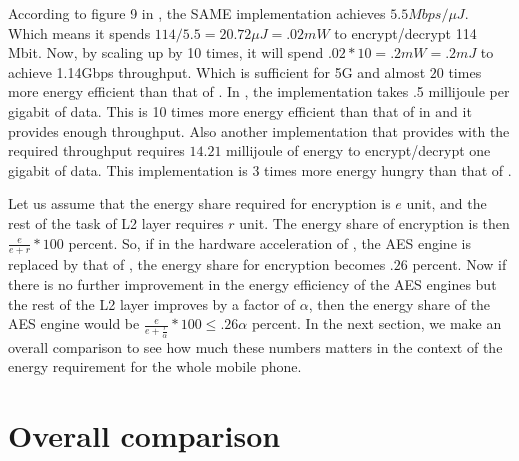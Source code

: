 According to figure 9 in \cite{Ruhr_2011}, the SAME implementation achieves $5.5Mbps/ \mu J$. Which means it spends $114/5.5 = 20.72\mu J = .02 mW$ to encrypt/decrypt 114 Mbit. Now, by scaling up by 10 times, it will spend $.02*10=.2mW = .2mJ$ to achieve 1.14Gbps throughput. Which is sufficient for 5G and almost $20$ times more energy efficient than that of \cite{IIS_Ruhr_2010}. In \cite{Ruhr_2009}, the implementation takes .5 millijoule per gigabit of data. This is 10 times more energy efficient than that of in \cite{IIS_Ruhr_2010} and it provides enough throughput. Also another implementation that provides with the required throughput requires $14.21$ millijoule of energy to encrypt/decrypt one gigabit of data. This implementation is $3$ times more energy hungry than that of \cite{Ruhr_2009}. 

Let us assume that the energy share required for encryption is $e$ unit, and the rest of the task of L2 layer requires $r$ unit. The energy share of encryption is then $\frac{e}{e+r}*100$ percent. So, if in the hardware acceleration of \cite{IIS_Ruhr_2010}, the AES engine is replaced by that of \cite{Ruhr_2011}, the energy share for encryption becomes $.26$ percent. Now if there is no further improvement in the energy efficiency of the AES engines but the rest of the L2 layer improves by a factor of $\alpha$, then the energy share of the AES engine would be $\frac{e}{e+\frac{r}{\alpha}}*100 \leq .26 \alpha$ percent. In the next section, we make an overall comparison to see how much these numbers matters in the context of the energy requirement for the whole mobile phone.

\section{Overall comparison}
\label{sec:overall_comparison}

\label{sec:aes}


